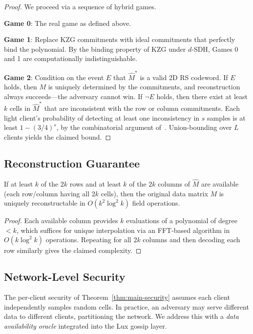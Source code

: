 \begin{proof}
We proceed via a sequence of hybrid games.

\textbf{Game 0}: The real game as defined above.

\textbf{Game 1}: Replace KZG commitments with ideal commitments that perfectly bind the
polynomial. By the binding property of KZG under $d$-SDH, Games 0 and 1 are
computationally indistinguishable.

\textbf{Game 2}: Condition on the event $E$ that $\hat{M}^*$ is a valid 2D RS codeword.
If $E$ holds, then $M$ is uniquely determined by the commitments, and reconstruction always
succeeds---the adversary cannot win. If $\neg E$ holds, then there exist at least $k$ cells
in $\hat{M}^*$ that are inconsistent with the row or column commitments. Each light client's
probability of detecting at least one inconsistency in $s$ samples is at least
$1 - (3/4)^s$, by the combinatorial argument of~\cite{albassam2018fraud}. Union-bounding
over $L$ clients yields the claimed bound.
\end{proof}

\subsection{Reconstruction Guarantee}

\begin{theorem}
\label{thm:reconstruction}
If at least $k$ of the $2k$ rows and at least $k$ of the $2k$ columns of $\hat{M}$ are
available (each row/column having all $2k$ cells), then the original data matrix $M$ is
uniquely reconstructable in $O(k^2 \log^2 k)$ field operations.
\end{theorem}

\begin{proof}
Each available column provides $k$ evaluations of a polynomial of degree $< k$, which
suffices for unique interpolation via an FFT-based algorithm in $O(k \log^2 k)$ operations.
Repeating for all $2k$ columns and then decoding each row similarly gives the claimed
complexity.
\end{proof}

\subsection{Network-Level Security}

The per-client security of Theorem~\ref{thm:main-security} assumes each client independently
samples random cells. In practice, an adversary may serve different data to different clients,
partitioning the network. We address this with a \emph{data availability oracle} integrated
into the Lux gossip layer.

